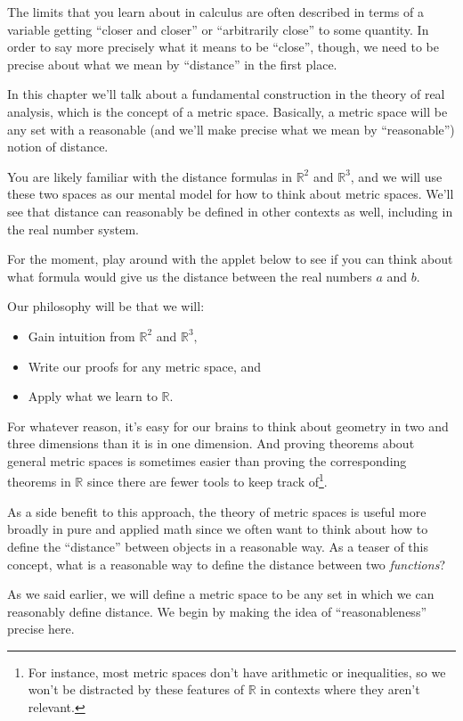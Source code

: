 \documentclass[
  letterpaper,
  DIV=11,
  numbers=noendperiod]{scrreprt}
\providecommand{\tightlist}{%
  \setlength{\itemsep}{0pt}\setlength{\parskip}{0pt}}
\def\R{\mathbb R}
\theoremstyle{plain}
\theoremstyle{definition}
\theoremstyle{plain}
\theoremstyle{plain}
\theoremstyle{definition}
\theoremstyle{definition}
\theoremstyle{remark}
\begin{document}
The limits that you learn about in calculus are often described in terms
of a variable getting ``closer and closer'' or ``arbitrarily close'' to
some quantity. In order to say more precisely what it means to be
``close'', though, we need to be precise about what we mean by
``distance'' in the first place.

In this chapter we'll talk about a fundamental construction in the
theory of real analysis, which is the concept of a metric space.
Basically, a metric space will be any set with a reasonable (and we'll
make precise what we mean by ``reasonable'') notion of distance.

You are likely familiar with the distance formulas in \(\R^2\) and
\(\R^3\), and we will use these two spaces as our mental model for how
to think about metric spaces. We'll see that distance can reasonably be
defined in other contexts as well, including in the real number system.

For the moment, play around with the applet below to see if you can
think about what formula would give us the distance between the real
numbers \(a\) and \(b\).

Our philosophy will be that we will:

\begin{itemize}
\tightlist
\item
  Gain intuition from \(\R^2\) and \(\R^3,\)
\item
  Write our proofs for any metric space, and
\item
  Apply what we learn to \(\R.\)
\end{itemize}

For whatever reason, it's easy for our brains to think about geometry in
two and three dimensions than it is in one dimension. And proving
theorems about general metric spaces is sometimes easier than proving
the corresponding theorems in \(\R\) since there are fewer tools to keep
track of\footnote{For instance, most metric spaces don't have arithmetic
  or inequalities, so we won't be distracted by these features of \(\R\)
  in contexts where they aren't relevant.}.

As a side benefit to this approach, the theory of metric spaces is
useful more broadly in pure and applied math since we often want to
think about how to define the ``distance'' between objects in a
reasonable way. As a teaser of this concept, what is a reasonable way to
define the distance between two \emph{functions}?

As we said earlier, we will define a metric space to be any set in which
we can reasonably define distance. We begin by making the idea of
``reasonableness'' precise here.
\end{document}
